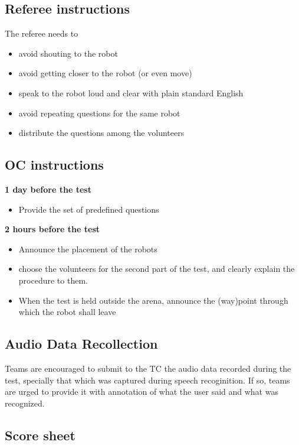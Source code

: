
\subsection{Referee instructions}

The referee needs to
\begin{itemize}
    \item avoid shouting to the robot
    \item avoid getting closer to the robot (or even move)
    \item speak to the robot loud and clear with plain standard English
    \item avoid repeating questions for the same robot
    \item distribute the questions among the volunteers
\end{itemize}

\subsection{OC instructions}

\textbf{1 day before the test}
\begin{itemize}
    \item Provide the set of predefined questions
\end{itemize}

\textbf{2 hours before the test}
\begin{itemize}
    \item Announce the placement of the robots
    \item choose the volunteers for the second part of the test, and clearly explain the procedure to them.
    \item When the test is held outside the arena, announce the (way)point through which the robot shall leave
\end{itemize}

\subsection {Audio Data Recollection}
Teams are encouraged to submit to the TC the audio data recorded during the test, specially that which was captured during speech recoginition. If so, teams are urged to provide it with annotation of what the user said and what was recognized.

\newpage
\subsection{Score sheet}


